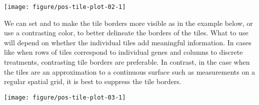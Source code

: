 \documentclass[krantz2]{krantz}\usepackage{knitr}%
\begin{document}
\begin{knitrout}\footnotesize
{}\color{fgcolor}\begin{kframe}
\begin{alltt}
\hlstd{(}\hlstd{)}
 \hlkwb{<-} \hlstd{(} \hlstd{=} \hlstd{(}\hlstd{,}  \hlstd{=} \hlstd{,}  \hlstd{=} \hlstd{),}
                          \hlstd{=} \hlstd{(letters[}\hlopt{:}\hlstd{],} \hlstd{),}
                          \hlstd{= LETTERS[}\hlstd{(}\hlopt{:}\hlstd{,} \hlstd{(}\hlstd{,} \hlstd{))])}
\end{alltt}
\end{kframe}
\end{knitrout}

\begin{knitrout}\footnotesize
{}\color{fgcolor}\begin{kframe}
\begin{alltt}
    \hlopt{+}
  \hlstd{()}
\end{alltt}
\end{kframe}

{\centering \texttt{[image: figure/pos-tile-plot-02-1]} 

}



\end{knitrout}

We can set  and  to make the tile borders more visible as in the example below, or use a contrasting color, to better delineate the borders of the tiles. What to use will depend on whether the individual tiles add meaningful information. In cases like when rows of tiles correspond to individual genes and columns to discrete treatments, contrasting tile borders are preferable. In contrast, in the case when the tiles are an approximation to a continuous surface such as measurements on a regular spatial grid, it is best to suppress the tile borders.

\begin{knitrout}\footnotesize
{}\color{fgcolor}\begin{kframe}
\begin{alltt}
    \hlopt{+}
  \hlstd{(} \hlstd{=} \hlstd{,}  \hlstd{=} \hlstd{)}
\end{alltt}
\end{kframe}

{\centering \texttt{[image: figure/pos-tile-plot-03-1]} 

}



\end{knitrout}
\end{document}
